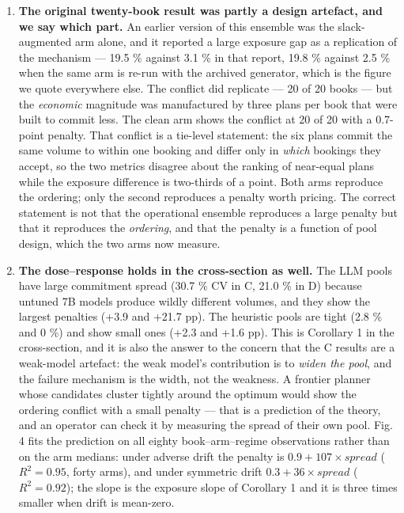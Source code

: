 \documentclass[preprint,12pt,letterpaper]{elsarticle}
\theoremstyle{definition}
\theoremstyle{plain}
\begin{document}
\begin{enumerate}
\item \textbf{The original twenty-book result was partly a design artefact, and we say which part.} An earlier version of this ensemble was the slack-augmented arm alone, and it reported a large exposure gap as a replication of the mechanism --- 19.5 \% against 3.1 \% in that report, 19.8 \% against 2.5 \% when the same arm is re-run with the archived generator, which is the figure we quote everywhere else. The conflict did replicate --- 20 of 20 books --- but the \textit{economic} magnitude was manufactured by three plans per book that were built to commit less. The clean arm shows the conflict at 20 of 20 with a 0.7-point penalty. That conflict is a tie-level statement: the six plans commit the same volume to within one booking and differ only in \textit{which} bookings they accept, so the two metrics disagree about the ranking of near-equal plans while the exposure difference is two-thirds of a point. Both arms reproduce the ordering; only the second reproduces a penalty worth pricing. The correct statement is not that the operational ensemble reproduces a large penalty but that it reproduces the \textit{ordering}, and that the penalty is a function of pool design, which the two arms now measure.
\item \textbf{The dose--response holds in the cross-section as well.} The LLM pools have large commitment spread (30.7 \% CV in C, 21.0 \% in D) because untuned 7B models produce wildly different volumes, and they show the largest penalties (+3.9 and +21.7 pp). The heuristic pools are tight (2.8 \% and 0 \%) and show small ones (+2.3 and +1.6 pp). This is Corollary 1 in the cross-section, and it is also the answer to the concern that the C results are a weak-model artefact: the weak model's contribution is to \textit{widen the pool}, and the failure mechanism is the width, not the weakness. A frontier planner whose candidates cluster tightly around the optimum would show the ordering conflict with a small penalty --- that is a prediction of the theory, and an operator can check it by measuring the spread of their own pool. Fig. 4 fits the prediction on all eighty book--arm--regime observations rather than on the arm medians: under adverse drift the penalty is $0.9 + 107 \times spread$ ($R^{2} = 0.95$, forty arms), and under symmetric drift $0.3 + 36 \times spread$ ($R^{2} = 0.92$); the slope is the exposure slope of Corollary 1 and it is three times smaller when drift is mean-zero.

\end{enumerate}
\end{document}
